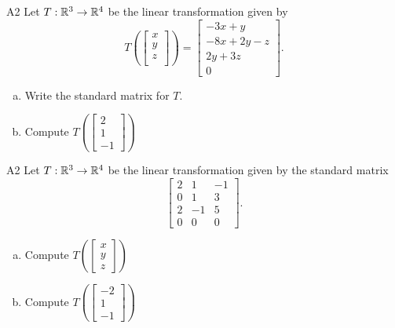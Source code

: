 \begin{problem}{A2}
Let $T: \mathbb{R}^3\rightarrow \mathbb{R}^4$ be the linear transformation given by $$T\left(\begin{bmatrix} x \\ y \\ z \\  \end{bmatrix} \right) = \begin{bmatrix} -3x+y \\ -8x+2y-z \\ 2y+3z \\ 0 \end{bmatrix}.$$
\begin{enumerate}[(a)]
\item Write the standard matrix for $T$.
\item Compute \(T\left( \begin{bmatrix} 2 \\ 1 \\ -1 \end{bmatrix}\right)\)
\end{enumerate}
\end{problem}

\begin{problem}{A2}
Let $T: \mathbb{R}^3\rightarrow \mathbb{R}^4$ be the linear transformation given by the standard matrix
\[ \begin{bmatrix}
2 & 1 & -1 \\ 0 & 1 & 3 \\ 2 & -1 & 5 \\ 0 & 0 & 0
\end{bmatrix}. \]
\begin{enumerate}[(a)]
\item Compute \( T\left( \begin{bmatrix}x\\ y \\ z \end{bmatrix} \right) \)
\item Compute \(T\left( \begin{bmatrix} -2 \\ 1 \\ -1 \end{bmatrix}\right)\)
\end{enumerate}
\end{problem}


